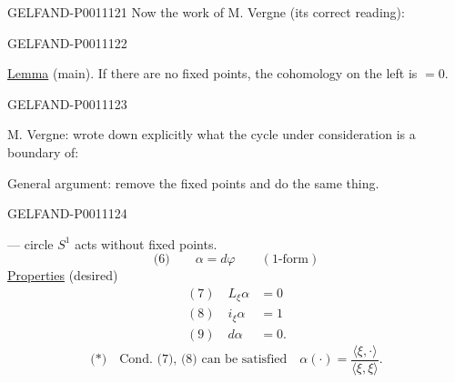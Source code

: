 \begin{GelfandAdjacentEvidence}{GELFAND-P001112}{1}
Now the work of M. Vergne (its correct reading):

\end{GelfandAdjacentEvidence}
\begin{GelfandAdjacentEvidence}{GELFAND-P001112}{2}


\underline{Lemma} (main). If there are no fixed points, the cohomology on the left is $=0$.
\end{GelfandAdjacentEvidence}
\begin{GelfandAdjacentEvidence}{GELFAND-P001112}{3}


M. Vergne: wrote down explicitly what the cycle under consideration is a boundary of:

General argument: remove the fixed points and do the same thing.

\end{GelfandAdjacentEvidence}
\begin{GelfandAdjacentEvidence}{GELFAND-P001112}{4}

— circle $S^1$ acts without fixed points.
\[
\text{(6)}\qquad \alpha=d\varphi\qquad(1\text{-form})
\]
\underline{Properties} (desired)
\[
\begin{aligned}
(7)\quad L_\xi\alpha&=0\\
(8)\quad i_\xi\alpha&=1\\
(9)\quad d\alpha&=0.
\end{aligned}
\]
\[
\text{(*)}\quad \text{Cond. (7), (8) can be satisfied}\quad
\alpha(\cdot)=\frac{\langle\xi,\cdot\rangle}{\langle\xi,\xi\rangle}.
\]

\end{GelfandAdjacentEvidence}
